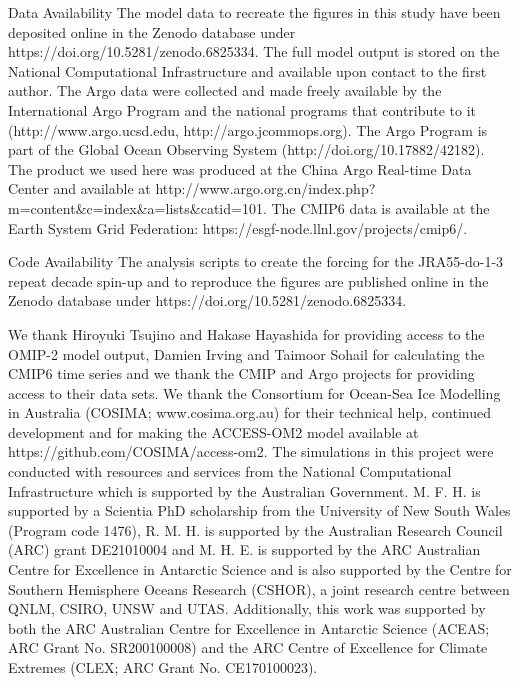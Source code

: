 \documentclass{nature}
\begin{document}
	\begin{addendum}
		\item[Data Availability] The model data to recreate the figures in this study have been deposited online in the Zenodo database under https://doi.org/10.5281/zenodo.6825334\cite{huguenin2022ohcscripts}. The full model output is stored on the National Computational Infrastructure and available upon contact to the first author. The Argo data were collected and made freely available by the International Argo Program and the national programs that contribute to it (http://www.argo.ucsd.edu, http://argo.jcommops.org). The Argo Program is part of the Global Ocean Observing System (http://doi.org/10.17882/42182). The product we used here was produced at the China Argo Real-time Data Center and available at http://www.argo.org.cn/index.php?m=content\&c=index\&a=lists\&catid=101. The CMIP6 data is available at the Earth System Grid Federation: https://esgf-node.llnl.gov/projects/cmip6/.
		
		\item[Code Availability] The analysis scripts to create the forcing for the JRA55-do-1-3 repeat decade spin-up and to reproduce the figures are published online in the Zenodo database under https://doi.org/10.5281/zenodo.6825334\cite{huguenin2022ohcscripts}.
		
		\item We thank Hiroyuki Tsujino and Hakase Hayashida for providing access to the OMIP-2 model output, Damien Irving and Taimoor Sohail for calculating the CMIP6 time series and we thank the CMIP and Argo projects for providing access to their data sets. We thank the Consortium for Ocean-Sea Ice Modelling in Australia (COSIMA; www.cosima.org.au) for their technical help, continued development and for making the ACCESS-OM2 model available at https://github.com/COSIMA/access-om2. The simulations in this project were conducted with resources and services from the National Computational Infrastructure which is supported by the Australian Government. M. F. H. is supported by a Scientia PhD scholarship from the University of New South Wales (Program code 1476), R. M. H. is supported by the Australian Research Council (ARC) grant DE21010004 and M. H. E. is supported by the ARC Australian Centre for Excellence in Antarctic Science and is also supported by the Centre for Southern Hemisphere Oceans Research (CSHOR), a joint research centre between QNLM, CSIRO, UNSW and UTAS. Additionally, this work was supported by both the ARC Australian Centre for Excellence in Antarctic Science (ACEAS; ARC Grant No. SR200100008) and the ARC Centre of Excellence for Climate Extremes (CLEX; ARC Grant No. CE170100023).
		

\end{addendum}
\end{document}

